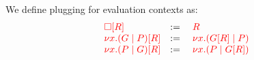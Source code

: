 \begin{definition}[Plugging]\label{def:cp-evaluation-contexts-plugging}
  We define plugging for evaluation contexts as:
  \[\!
    \begin{array}{lcl}
      \textcolor{red}{{\Box}[{R}]}            &:=& \; \textcolor{red}{R} \\
      \textcolor{red}{{\nu x.(G \mid P)}[{R}]} &:=& \; \textcolor{red}{\nu x.({G}[{R}] \mid P)} \\
      \textcolor{red}{{\nu x.(P \mid G)}[{R}]} &:=& \; \textcolor{red}{\nu x.(P \mid {G}[{R}])}
    \end{array}
  \]
\end{definition}
